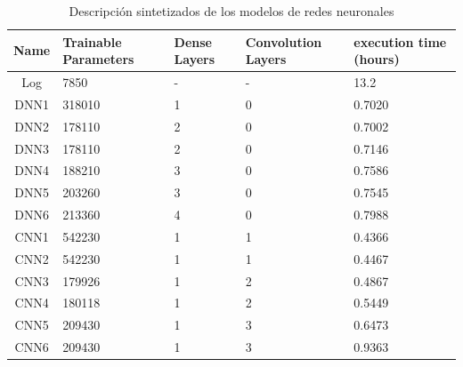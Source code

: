 \documentclass[11pt]{article}
\begin{document}
\begin{table}[H]
    \centering
    \begin{tabular}{c| p{1.5cm}| p{1.5cm}| p{2cm}| p{1.5cm}}
        \toprule
        Name &  Trainable Parameters &  Dense Layers &  Convolution Layers &  execution  time (hours) \\
        \midrule
        Log & 7850 & - & - & 13.2 \\
        DNN1 &                318010 &             1 &                   0 &                   0.7020 \\
        DNN2 &                178110 &             2 &                   0 &                   0.7002 \\
        DNN3 &                178110 &             2 &                   0 &                   0.7146 \\
        DNN4 &                188210 &             3 &                   0 &                   0.7586 \\
        DNN5 &                203260 &             3 &                   0 &                   0.7545 \\
        DNN6 &                213360 &             4 &                   0 &                   0.7988 \\
        CNN1 &                542230 &             1 &                   1 &                   0.4366 \\
        CNN2 &                542230 &             1 &                   1 &                   0.4467 \\
        CNN3 &                179926 &             1 &                   2 &                   0.4867 \\
        CNN4 &                180118 &             1 &                   2 &                   0.5449 \\
        CNN5 &                209430 &             1 &                   3 &                   0.6473 \\
        CNN6 &                209430 &             1 &                   3 &                   0.9363 \\
        \bottomrule
    \end{tabular}        
    \caption{Descripción sintetizados de los modelos de redes neuronales}
    \label{tab:fullDescrip}
\end{table}
\end{document}
